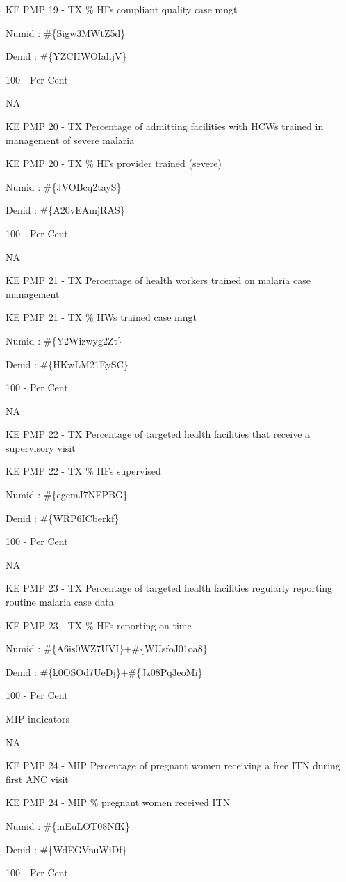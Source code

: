 \documentclass[]{book}
\begin{document}
KE PMP 19 - TX \% HFs compliant quality case mngt

Numid : \#\{Sigw3MWtZ5d\}

Denid : \#\{YZCHWOIahjV\}

100 - Per Cent

NA

KE PMP 20 - TX Percentage of admitting facilities with HCWs trained in management of severe malaria

KE PMP 20 - TX \% HFs provider trained (severe)

Numid : \#\{JVOBcq2tayS\}

Denid : \#\{A20vEAmjRAS\}

100 - Per Cent

NA

KE PMP 21 - TX Percentage of health workers trained on malaria case management

KE PMP 21 - TX \% HWs trained case mngt

Numid : \#\{Y2Wizwyg2Zt\}

Denid : \#\{HKwLM21EySC\}

100 - Per Cent

NA

KE PMP 22 - TX Percentage of targeted health facilities that receive a supervisory visit

KE PMP 22 - TX \% HFs supervised

Numid : \#\{egcmJ7NFPBG\}

Denid : \#\{WRP6ICberkf\}

100 - Per Cent

NA

KE PMP 23 - TX Percentage of targeted health facilities regularly reporting routine malaria case data

KE PMP 23 - TX \% HFs reporting on time

Numid : \#\{A6is0WZ7UVI\}+\#\{WUsfoJ01oa8\}

Denid : \#\{k0OSOd7UeDj\}+\#\{Jz08Pq3eoMi\}

100 - Per Cent

MIP indicators

NA

KE PMP 24 - MIP Percentage of pregnant women receiving a free ITN during first ANC visit

KE PMP 24 - MIP \% pregnant women received ITN

Numid : \#\{mEuLOT08NfK\}

Denid : \#\{WdEGVnuWiDf\}

100 - Per Cent
\end{document}
